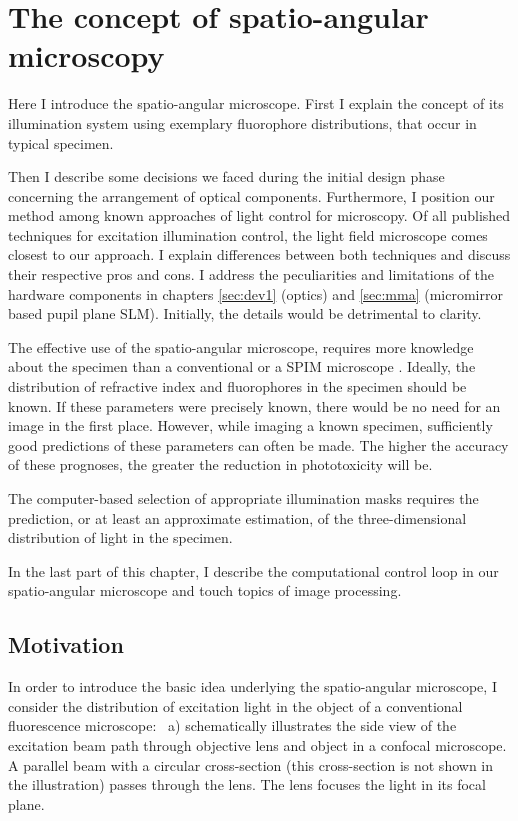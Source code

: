 \chapter{The concept of spatio-angular microscopy}
\label{sec:concept}
\begin{summary}
  Here I introduce the spatio-angular microscope. First I explain the
  concept of its illumination system using exemplary fluorophore
  distributions, that occur in typical specimen.

  Then I describe some decisions we faced during the initial design
  phase concerning the arrangement of optical components. Furthermore,
  I position our method among known approaches of light control for
  microscopy. Of all published techniques for excitation illumination
  control, the light field microscope \citep{levoy2006} comes closest
  to our approach.  I explain differences between both techniques and
  discuss their respective pros and cons.  I address the peculiarities
  and limitations of the hardware components in chapters
  \ref{sec:dev1} (optics) and \ref{sec:mma} (micromirror based pupil
  plane SLM).  Initially, the details would be detrimental to clarity.

  The effective use of the spatio-angular microscope, requires more
  knowledge about the specimen than a conventional or a SPIM
  microscope \citep{Huisken2004}. Ideally, the distribution of
  refractive index and fluorophores in the specimen should be
  known. If these parameters were precisely known, there would be no
  need for an image in the first place. However, while imaging a known
  specimen, sufficiently good predictions of these parameters can
  often be made. The higher the accuracy of these prognoses, the
  greater the reduction in phototoxicity will be.

  The computer-based selection of appropriate illumination masks
  requires the prediction, or at least an approximate estimation, of
  the three-dimensional distribution of light in the specimen.

  In the last part of this chapter, I describe the computational
  control loop in our spatio-angular
  microscope and touch topics of image processing.
\end{summary}
\section{Motivation}
In order to introduce the basic idea underlying the spatio-angular
microscope, I consider the distribution of excitation light in the
object of a conventional fluorescence microscope:
~a) schematically illustrates the side view
of the excitation beam path through objective lens and object in a
confocal microscope. A parallel beam with a circular cross-section
(this cross-section is not shown in the illustration) passes through
the lens. The lens focuses the light in its focal plane.

